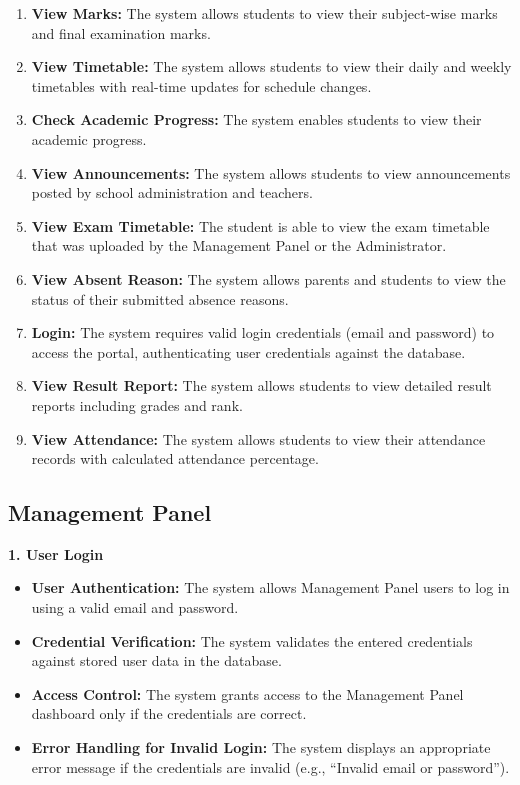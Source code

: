 \documentclass[12pt, a4paper]{report}
\begin{document}
\begin{enumerate}
    \item \textbf{View Marks:} The system allows students to view their subject-wise marks and final examination marks.
    \item \textbf{View Timetable:} The system allows students to view their daily and weekly timetables with real-time updates for schedule changes.
    \item \textbf{Check Academic Progress:} The system enables students to view their academic progress.
    \item \textbf{View Announcements:} The system allows students to view announcements posted by school administration and teachers.
    \item \textbf{View Exam Timetable:} The student is able to view the exam timetable that was uploaded by the Management Panel or the Administrator.
    \item \textbf{View Absent Reason:} The system allows parents and students to view the status of their submitted absence reasons.
    \item \textbf{Login:} The system requires valid login credentials (email and password) to access the portal, authenticating user credentials against the database.
    \item \textbf{View Result Report:} The system allows students to view detailed result reports including grades and rank.
    \item \textbf{View Attendance:} The system allows students to view their attendance records with calculated attendance percentage.
\end{enumerate}

\subsection{Management Panel}

\textbf{1. User Login}
\begin{itemize}
    \item \textbf{User Authentication:} The system allows Management Panel users to log in using a valid email and password.
    \item \textbf{Credential Verification:} The system validates the entered credentials against stored user data in the database.
    \item \textbf{Access Control:} The system grants access to the Management Panel dashboard only if the credentials are correct.
    \item \textbf{Error Handling for Invalid Login:} The system displays an appropriate error message if the credentials are invalid (e.g., ``Invalid email or password'').
\end{itemize}
\end{document}
